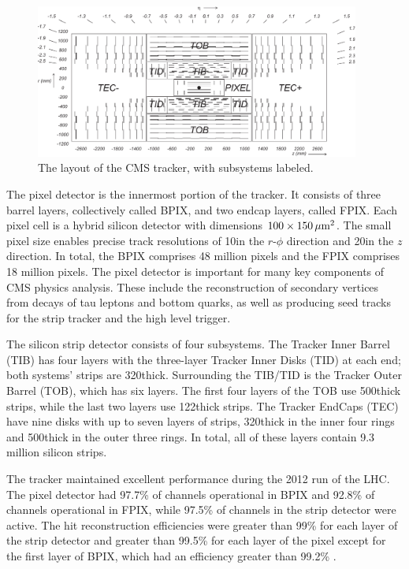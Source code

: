 \begin{figure}[hbt]
\begin{center}
\includegraphics[width=0.95\textwidth]{figures/CMS_tracker.pdf}
\caption{The layout of the CMS tracker, with subsystems labeled.}
\label{fig:tk-layout}
\end{center}
\end{figure}

The pixel detector is the innermost portion of the tracker. It consists of three barrel layers, collectively called BPIX, and two endcap layers, called FPIX. Each pixel cell is a hybrid silicon detector with dimensions $100\times150\,\mu\text{m}^{2}$. The small pixel size enables precise track resolutions of 10\mum in the $r$-$\phi$ direction and 20\mum in the $z$ direction. In total, the BPIX comprises 48 million pixels and the FPIX comprises 18 million pixels. The pixel detector is important for many key components of CMS physics analysis. These include the reconstruction of secondary vertices from decays of tau leptons and bottom quarks, as well as producing seed tracks for the strip tracker and the high level trigger.

The silicon strip detector consists of four subsystems. The Tracker Inner Barrel (TIB) has four layers with the three-layer Tracker Inner Disks (TID) at each end; both systems' strips are 320\mum thick. Surrounding the TIB/TID is the Tracker Outer Barrel (TOB), which has six layers. The first four layers of the TOB use 500\mum thick strips, while the last two layers use 122\mum thick strips. The Tracker EndCaps (TEC) have nine disks with up to seven layers of strips, 320\mum thick in the inner four rings and 500\mum thick in the outer three rings. In total, all of these layers contain 9.3 million silicon strips.

The tracker maintained excellent performance during the 2012 run of the LHC. The pixel detector had 97.7\% of channels operational in BPIX and 92.8\% of channels operational in FPIX, while 97.5\% of channels in the strip detector were active. The hit reconstruction efficiencies were greater than 99\% for each layer of the strip detector and greater than 99.5\% for each layer of the pixel except for the first layer of BPIX, which had an efficiency greater than 99.2\% \cite{Veszpremi:2014hpa}. 

